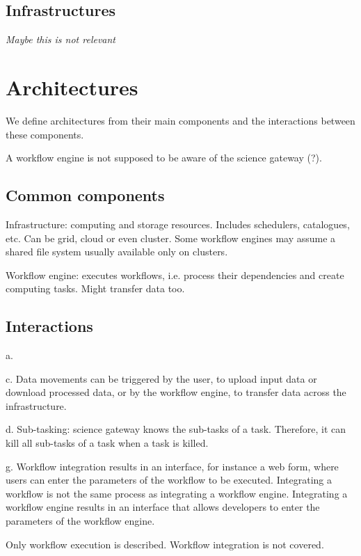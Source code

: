 \documentclass[preprint,3p,twocolumn]{elsarticle}
\newcommand{\todo}[1]{\color{blue}\xspace\emph{#1}\xspace\color{black}}
\begin{document}
\subsection{Infrastructures}

\todo{Maybe this is not relevant}

\section{Architectures}

We define architectures from their main components and the interactions
between these components.

A workflow engine is not supposed to be aware of the science gateway (?).

\subsection{Common components}

Infrastructure: computing and storage resources. Includes
  schedulers, catalogues, etc. Can be grid, cloud or even
  cluster. Some workflow engines may assume a shared file system
  usually available only on clusters.

  Workflow engine: executes workflows, i.e. process their dependencies
  and create computing tasks. Might transfer data too.

\subsection{Interactions}

a. 

c. Data movements can be triggered by the user, to upload input data
or download processed data, or by the workflow engine, to transfer
data across the infrastructure. 

d. Sub-tasking: science gateway knows the sub-tasks of a
task. Therefore, it can kill all sub-tasks of a task when a task is killed.

g. Workflow integration results in an interface, for instance a web form,
where users can enter the parameters of the workflow to be
executed. Integrating a workflow is not the same process as
integrating a workflow engine. Integrating a workflow engine results
in an interface that allows developers to enter the parameters of the
workflow engine.


Only workflow execution is described. 
Workflow integration is not covered. 
\end{document}
